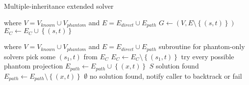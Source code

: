 \begin{algorithm} 
  \caption{Multiple-inheritance extended solver}
  \label{hiercomp/alg:multiple:ext}

  \hrulefill

  \begin{algorithmic}[1]
     where $V = V_{known} \cup V_{phantom}$ and $E = E_{direct} \cup E_{path}$
          \State $G \gets (V,E \setminus \left\{(s,t)\right\})$
            \State $E_C \gets E_C \cup \left\{(s,t)\right\}$
          \EndIf
        \EndIf
      \EndFor
      \State \Return {}
    \EndFunction
  \end{algorithmic}

  \hrulefill

  \begin{algorithmic}[1]
     where $V = V_{known} \cup V_{phantom}$ and $E = E_{direct} \cup E_{path}$
        \State {}
        \Comment subroutine for phantom-only solvers
      \Else
        \State pick some $(s_1,t)$ from $E_C$
        \State $E_C \gets E_C \setminus \left\{(s_1,t)\right\}$
         \Comment try every possible phantom projection
          \State $E_{path} \gets E_{path} \cup \left\{(x,t)\right\}$ 
            \Return $S$ \Comment solution found
          \EndIf
          \State  $E_{path} \gets E_{path} \setminus \left\{(x,t)\right\}$ 
        \EndFor
        \State \Return $\emptyset$ \Comment no solution found, notify caller to backtrack or fail
      \EndIf
    \EndFunction
  \end{algorithmic}

\end{algorithm} 

